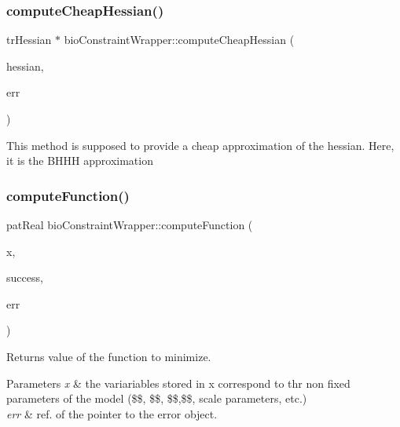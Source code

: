 \subsubsection{\texorpdfstring{compute\+Cheap\+Hessian()}{computeCheapHessian()}}
{\footnotesize\ttfamily tr\+Hessian $\ast$ bio\+Constraint\+Wrapper\+::compute\+Cheap\+Hessian (\begin{DoxyParamCaption}\item[{tr\+Hessian $\ast$}]{hessian,  }\item[{pat\+Error $\ast$\&}]{err }\end{DoxyParamCaption})}

This method is supposed to provide a cheap approximation of the hessian. Here, it is the B\+H\+HH approximation \mbox{\label{classbio_constraint_wrapper_a63a339cbc90f002d3945b1c64286fbcc}} 
\subsubsection{\texorpdfstring{compute\+Function()}{computeFunction()}}
{\footnotesize\ttfamily pat\+Real bio\+Constraint\+Wrapper\+::compute\+Function (\begin{DoxyParamCaption}\item[{tr\+Vector $\ast$}]{x,  }\item[{pat\+Boolean $\ast$}]{success,  }\item[{pat\+Error $\ast$\&}]{err }\end{DoxyParamCaption})}

\begin{DoxyReturn}{Returns}
value of the function to minimize. 
\end{DoxyReturn}

\begin{DoxyParams}{Parameters}
{\em x} & the variariables stored in x correspond to thr non fixed parameters of the model (\$\$, \$\$, \$\$,\$\$, scale parameters, etc.) \\
\hline
{\em err} & ref. of the pointer to the error object. \\
\hline
\end{DoxyParams}
\mbox{\label{classbio_constraint_wrapper_abe425baa0389a902c1a4661e6d3ac6b9}} 
